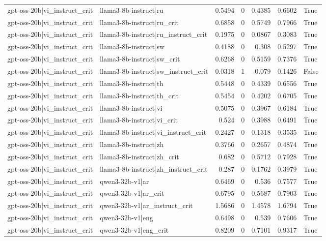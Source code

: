 \begin{table}
\begin{tabular}{l l r r r r l}
gpt-oss-20b|vi_instruct_crit & llama3-8b-instruct|ru & 0.5494 & 0 & 0.4385 & 0.6602 & True \\
gpt-oss-20b|vi_instruct_crit & llama3-8b-instruct|ru_crit & 0.6858 & 0 & 0.5749 & 0.7966 & True \\
gpt-oss-20b|vi_instruct_crit & llama3-8b-instruct|ru_instruct_crit & 0.1975 & 0 & 0.0867 & 0.3083 & True \\
gpt-oss-20b|vi_instruct_crit & llama3-8b-instruct|sw & 0.4188 & 0 & 0.308 & 0.5297 & True \\
gpt-oss-20b|vi_instruct_crit & llama3-8b-instruct|sw_crit & 0.6268 & 0 & 0.5159 & 0.7376 & True \\
gpt-oss-20b|vi_instruct_crit & llama3-8b-instruct|sw_instruct_crit & 0.0318 & 1 & -0.079 & 0.1426 & False \\
gpt-oss-20b|vi_instruct_crit & llama3-8b-instruct|th & 0.5448 & 0 & 0.4339 & 0.6556 & True \\
gpt-oss-20b|vi_instruct_crit & llama3-8b-instruct|th_crit & 0.5454 & 0 & 0.4202 & 0.6705 & True \\
gpt-oss-20b|vi_instruct_crit & llama3-8b-instruct|vi & 0.5075 & 0 & 0.3967 & 0.6184 & True \\
gpt-oss-20b|vi_instruct_crit & llama3-8b-instruct|vi_crit & 0.524 & 0 & 0.3988 & 0.6491 & True \\
gpt-oss-20b|vi_instruct_crit & llama3-8b-instruct|vi_instruct_crit & 0.2427 & 0 & 0.1318 & 0.3535 & True \\
gpt-oss-20b|vi_instruct_crit & llama3-8b-instruct|zh & 0.3766 & 0 & 0.2657 & 0.4874 & True \\
gpt-oss-20b|vi_instruct_crit & llama3-8b-instruct|zh_crit & 0.682 & 0 & 0.5712 & 0.7928 & True \\
gpt-oss-20b|vi_instruct_crit & llama3-8b-instruct|zh_instruct_crit & 0.287 & 0 & 0.1762 & 0.3979 & True \\
gpt-oss-20b|vi_instruct_crit & qwen3-32b-v1|ar & 0.6469 & 0 & 0.536 & 0.7577 & True \\
gpt-oss-20b|vi_instruct_crit & qwen3-32b-v1|ar_crit & 0.6795 & 0 & 0.5687 & 0.7903 & True \\
gpt-oss-20b|vi_instruct_crit & qwen3-32b-v1|ar_instruct_crit & 1.5686 & 0 & 1.4578 & 1.6794 & True \\
gpt-oss-20b|vi_instruct_crit & qwen3-32b-v1|eng & 0.6498 & 0 & 0.539 & 0.7606 & True \\
gpt-oss-20b|vi_instruct_crit & qwen3-32b-v1|eng_crit & 0.8209 & 0 & 0.7101 & 0.9317 & True \\

\end{tabular}
\end{table}
